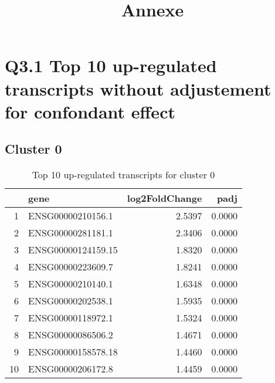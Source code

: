 \documentclass{article}
\begin{document}
\title{Annexe}
\maketitle
\tableofcontents
\newpage
\section{Q3.1 Top 10 up-regulated transcripts without adjustement for confondant effect}
\subsection{Cluster 0 }
\begin{table}[H]
\centering
\begin{tabularx}{\textwidth}{rlrr}
  \hline
 & gene & log2FoldChange & padj \\ 
  \hline
1 & ENSG00000210156.1 & 2.5397 & 0.0000 \\ 
  2 & ENSG00000281181.1 & 2.3406 & 0.0000 \\ 
  3 & ENSG00000124159.15 & 1.8320 & 0.0000 \\ 
  4 & ENSG00000223609.7 & 1.8241 & 0.0000 \\ 
  5 & ENSG00000210140.1 & 1.6348 & 0.0000 \\ 
  6 & ENSG00000202538.1 & 1.5935 & 0.0000 \\ 
  7 & ENSG00000118972.1 & 1.5324 & 0.0000 \\ 
  8 & ENSG00000086506.2 & 1.4671 & 0.0000 \\ 
  9 & ENSG00000158578.18 & 1.4460 & 0.0000 \\ 
  10 & ENSG00000206172.8 & 1.4459 & 0.0000 \\ 
   \hline
\end{tabularx}
\caption{Top 10 up-regulated transcripts for cluster 0} 
\label{tab:q3_1_0}
\end{table}
\end{document}
